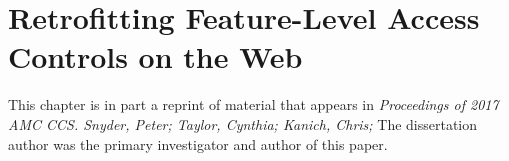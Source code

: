 \chapter{Retrofitting Feature-Level Access Controls on the Web}
\label{current-web}

This chapter is in part a reprint of material that appears in
\textit{Proceedings of 2017 AMC CCS. Snyder, Peter; Taylor,
Cynthia; Kanich, Chris;} The dissertation author was the primary investigator and
author of this paper.





